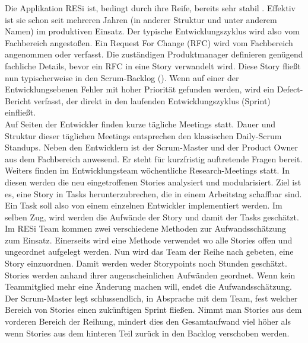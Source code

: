 Die Applikation RESi ist, bedingt durch ihre Reife, bereits sehr stabil . Effektiv ist sie schon seit mehreren Jahren (in anderer Struktur und unter anderem Namen) im produktiven Einsatz. Der typische Entwicklungszyklus wird also vom Fachbereich angestoßen. Ein Request For Change (RFC)  wird vom Fachbereich angenommen oder verfasst. Die zuständigen Produktmanager definieren genügend fachliche Details, bevor ein RFC in eine Story  verwandelt wird. Diese Story fließt nun typischerweise in den Scrum-Backlog (). Wenn auf einer der Entwicklungsebenen Fehler mit hoher Priorität gefunden werden, wird ein Defect-Bericht  verfasst, der direkt in den laufenden Entwicklungszyklus (Sprint) einfließt.\\
Auf Seiten der Entwickler finden kurze tägliche Meetings statt. Dauer und Struktur dieser täglichen Meetings entsprechen den klassischen Daily-Scrum Standups. Neben den Entwicklern ist der Scrum-Master und der Product Owner aus dem Fachbereich anwesend. Er steht für kurzfristig auftretende Fragen bereit. Weiters finden im Entwicklungsteam wöchentliche Research-Meetings statt. In diesen werden die neu eingetroffenen Stories analysiert und modularisiert. Ziel ist es, eine Story in Tasks herunterzubrechen, die in einem Arbeitstag schaffbar sind. Ein Task soll also von einem einzelnen Entwickler implementiert werden. Im selben Zug, wird werden die Aufwände der Story und damit der Tasks geschätzt. Im RESi Team kommen zwei verschiedene Methoden zur Aufwandsschätzung zum Einsatz. Einerseits wird eine Methode verwendet wo alle Stories offen und ungeordnet aufgelegt werden. Nun wird das Team der Reihe nach gebeten, eine Story einzuordnen. Damit werden weder Storypoints noch Stunden geschätzt. Stories werden anhand ihrer augenscheinlichen Aufwänden geordnet. Wenn kein Teammitglied mehr eine Änderung machen will, endet die Aufwandsschätzung. Der Scrum-Master legt schlussendlich, in Absprache mit dem Team, fest welcher Bereich von Stories einen zukünftigen Sprint fließen. Nimmt man Stories aus dem vorderen Bereich der Reihung, mindert dies den Gesamtaufwand viel höher als wenn Stories aus dem hinteren Teil zurück in den Backlog verschoben werden. 

